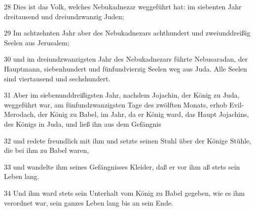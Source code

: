 \par 28 Dies ist das Volk, welches Nebukadnezar weggeführt hat: im siebenten Jahr dreitausend und dreiundzwanzig Juden;
\par 29 Im achtzehnten Jahr aber des Nebukadnezars achthundert und zweiunddreißig Seelen aus Jerusalem;
\par 30 und im dreiundzwanzigsten Jahr des Nebukadnezars führte Nebusaradan, der Hauptmann, siebenhundert und fünfundvierzig Seelen weg aus Juda. Alle Seelen sind viertausend und sechshundert.
\par 31 Aber im siebenunddreißigsten Jahr, nachdem Jojachin, der König zu Juda, weggeführt war, am fünfundzwanzigsten Tage des zwölften Monats, erhob Evil-Merodach, der König zu Babel, im Jahr, da er König ward, das Haupt Jojachins, des Königs in Juda, und ließ ihn aus dem Gefängnis
\par 32 und redete freundlich mit ihm und setzte seinen Stuhl über der Könige Stühle, die bei ihm zu Babel waren,
\par 33 und wandelte ihm seines Gefängnisses Kleider, daß er vor ihm aß stets sein Leben lang.
\par 34 Und ihm ward stets sein Unterhalt vom König zu Babel gegeben, wie es ihm verordnet war, sein ganzes Leben lang bis an sein Ende.

